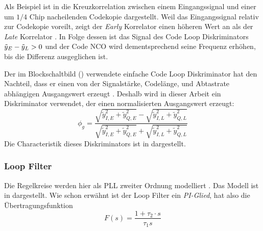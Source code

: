 Als Beispiel ist in  die Kreuzkorrelation zwischen einem Eingangssignal und einer um $1/4$ Chip nacheilenden Codekopie dargestellt. Weil das Eingangssignal relativ zur Codekopie voreilt, zeigt der \emph{Early} Korrelator \markerEarly einen höheren Wert an als der \emph{Late} Korrelator \markerLate. In Folge dessen ist das Signal des Code Loop Diskriminators  $\tilde{y}_E - \tilde{y}_L>0$ und der Code NCO wird dementsprechend seine Frequenz erhöhen, bis die Differenz ausgeglichen ist.



Der im Blockschaltbild () verwendete einfache Code Loop Diskriminator hat den Nachteil, dass er einen von der Signalstärke, Codelänge, und Abtastrate abhängigen Ausgangswert erzeugt \cite{borre2007software}. Deshalb wird in dieser Arbeit ein Diskriminator verwendet, der einen normalisierten Ausgangswert erzeugt:
\begin{equation}
    \phi_g = \frac{\sqrt{\tilde{y}_{I,E}^2+\tilde{y}_{Q,E}^2}-\sqrt{\tilde{y}_{I,L}^2+\tilde{y}_{Q,L}^2}}{\sqrt{\tilde{y}_{I,E}^2+\tilde{y}_{Q,E}^2}+\sqrt{\tilde{y}_{I,L}^2+\tilde{y}_{Q,L}^2}}
\end{equation}
Die Characteristik dieses Diskriminators ist in  dargestellt.


\subsubsection{Loop Filter} \label{loopfilter}
Die Regelkreise werden hier als PLL zweiter Ordnung modelliert \cite{borre2007software}. Das Modell ist in  dargestellt. Wie schon erwähnt ist der Loop Filter ein \emph{PI-Glied}, hat also die Übertragungsfunktion \cite{gardner2005phaselock}
\begin{equation}
\label{Eq:analogloopfilter}
    F(s)=\frac{1 + \tau_2 \cdot s}{\tau_1 s}
\end{equation}

